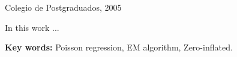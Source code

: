 \newpage
\thispagestyle{plain}
\begin{center}
  {\large \textbf{\eltituloen}}\\
  \vskip 0.5cm
  \elautor\\
  \vskip 0.5cm
  Colegio de Postgraduados, 2005\\
\end{center}

\vskip 0.5cm

\noindent In this work ...

\vskip 0.5cm
\noindent \textbf{Key words:} Poisson regression, EM algorithm, Zero-inflated.

\endinput  
